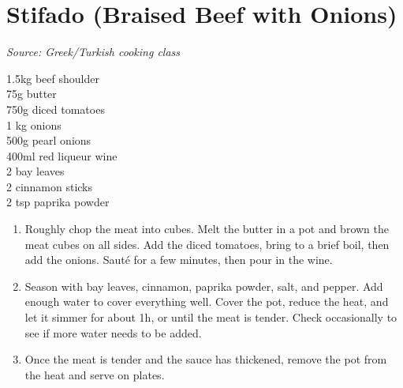 \documentclass{report}
\begin{document}
\section{Stifado (Braised Beef with Onions)}
\textit{Source: Greek/Turkish cooking class}\\
\begin{minipage}[t]{0.21\textwidth} \vspace{0pt} 
1.5kg beef shoulder \\
75g butter \\
750g diced tomatoes \\
1 kg onions \\
500g pearl onions \\
400ml red liqueur wine \\
2 bay leaves \\
2 cinnamon sticks \\
2 tsp paprika powder 
\end{minipage}
\hfill
\begin{minipage}[t]{0.78\textwidth} \vspace{0pt}
	\begin{enumerate}
		\item Roughly chop the meat into cubes. Melt the butter in a pot and brown the meat cubes on all sides. Add the diced tomatoes, bring to a brief boil, then add the onions. Sauté for a few minutes, then pour in the wine. 
		\item Season with bay leaves, cinnamon, paprika powder, salt, and pepper. Add enough water to cover everything well. Cover the pot, reduce the heat, and let it simmer for about 1h, or until the meat is tender. Check occasionally to see if more water needs to be added.
    	\item Once the meat is tender and the sauce has thickened, remove the pot from the heat and serve on plates.
	\end{enumerate}	
\end{minipage}
\end{document}
